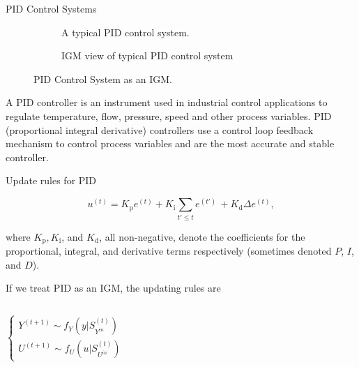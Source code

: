 \documentclass[10pt]{beamer}
\begin{document}
\begin{CJK*}{UTF8}{gbsn}
\begin{frame}{PID Control Systems}
\begin{figure}[h]
\begin{subfigure}[tb]{0.45\textwidth}
\begin{tikzpicture}[auto, node distance=1.2cm,>=latex']
        \end{tikzpicture}
		\caption{A typical PID control system.}
		\label{fig:pid1}
	\end{subfigure}
    \hfill
	\begin{subfigure}[tb]{0.5\textwidth}
		\centering
		\caption{IGM view of typical PID control system}
		\label{fig:pid2}
	\end{subfigure}\caption{PID Control System as an IGM.}
\end{figure}

A PID controller is an instrument used in industrial control applications to regulate temperature, flow, pressure, speed and other process variables. PID (proportional integral derivative) controllers use a control loop feedback mechanism to control process variables and are the most accurate and stable controller. 

\end{frame}


\begin{frame}{Update rules for PID}

\begin{equation}
\label{eq:pid}
    u^{(t)}=K_{\text{p}} e^{(t)}+K_{\text{i}}\sum_{t'\leq t}e^{(t')}\, +K_{\text{d}} \Delta e^{(t)},  
\end{equation}


where $K_{\text{p}}, K_{\text{i}}$, and $K_{\text{d}}$, all non-negative, denote the coefficients for the proportional, integral, and derivative terms respectively (sometimes denoted $P$, $I$, and $D$).

If we treat PID as an IGM, the updating rules are

    \begin{columns}[T,onlytextwidth]
    \begin{equation*} 
    \left\{
         \begin{array}{lr}
         Y^{(t+1)} \sim f_Y(y|S_{Y^{in}}^{(t)}) &  \\
         U^{(t+1)} \sim f_U(u|S_{U^{in}}^{(t)}) & 
         \end{array}
    \right.
    \end{equation*}
    

\end{columns}
\end{frame}
\end{CJK*}
\end{document}
